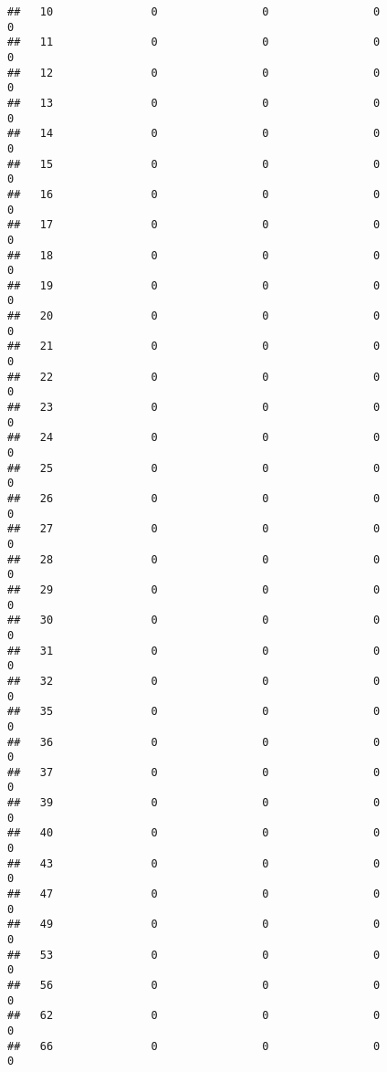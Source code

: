 \documentclass[]{article}
\begin{document}
\begin{verbatim}
##   10               0                0                0                0
##   11               0                0                0                0
##   12               0                0                0                0
##   13               0                0                0                0
##   14               0                0                0                0
##   15               0                0                0                0
##   16               0                0                0                0
##   17               0                0                0                0
##   18               0                0                0                0
##   19               0                0                0                0
##   20               0                0                0                0
##   21               0                0                0                0
##   22               0                0                0                0
##   23               0                0                0                0
##   24               0                0                0                0
##   25               0                0                0                0
##   26               0                0                0                0
##   27               0                0                0                0
##   28               0                0                0                0
##   29               0                0                0                0
##   30               0                0                0                0
##   31               0                0                0                0
##   32               0                0                0                0
##   35               0                0                0                0
##   36               0                0                0                0
##   37               0                0                0                0
##   39               0                0                0                0
##   40               0                0                0                0
##   43               0                0                0                0
##   47               0                0                0                0
##   49               0                0                0                0
##   53               0                0                0                0
##   56               0                0                0                0
##   62               0                0                0                0
##   66               0                0                0                0

\end{verbatim}
\end{document}
